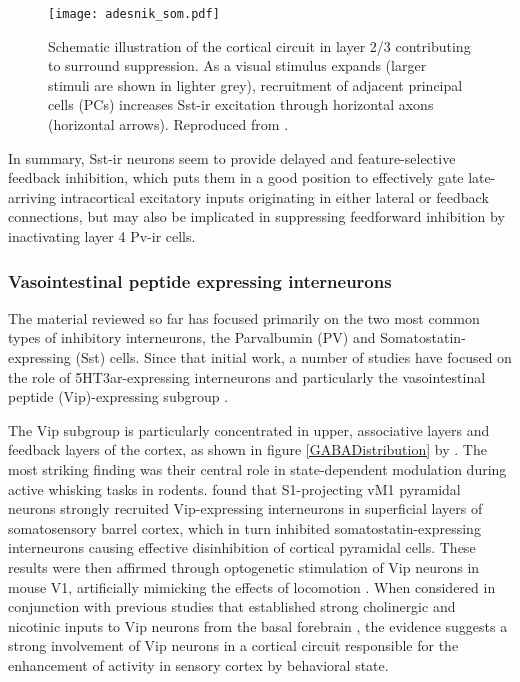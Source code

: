 \begin{figure}
	\centering
        \texttt{[image: adesnik\_som.pdf]}
	\caption[Schematic proposing Sst neurons' role in integrating
      long-range inputs. Reproduced from
      \cite{Adesnik2012}.]{Schematic illustration of the cortical
      circuit in layer 2/3 contributing to surround suppression. As a
      visual stimulus expands (larger stimuli are shown in lighter
      grey), recruitment of adjacent principal cells (PCs) increases
      Sst-ir excitation through horizontal axons (horizontal
      arrows). Reproduced from \cite{Adesnik2012}.}
	\label{som}
\end{figure}

In summary, Sst-ir neurons seem to provide delayed and
feature-selective feedback inhibition, which puts them in a good
position to effectively gate late-arriving intracortical excitatory
inputs originating in either lateral or feedback connections, but may
also be implicated in suppressing feedforward inhibition by
inactivating layer 4 Pv-ir cells.

\subsubsection{Vasointestinal peptide expressing interneurons}

The material reviewed so far has focused primarily on the two most
common types of inhibitory interneurons, the Parvalbumin (PV) and
Somatostatin-expressing (Sst) cells.  Since that initial work, a
number of studies have focused on the role of 5HT3ar-expressing
interneurons and particularly the vasointestinal peptide
(Vip)-expressing subgroup \citep{Lee2013, Fu2014, Higley2014,
  Kepecs2014}.

The Vip subgroup is particularly concentrated in upper, associative
layers and feedback layers of the cortex, as shown in figure
\ref{GABADistribution} by \cite{Rudy2011}. The most striking finding
was their central role in state-dependent modulation during active
whisking tasks in rodents. \cite{Lee2013} found that S1-projecting vM1
pyramidal neurons strongly recruited Vip-expressing interneurons in
superficial layers of somatosensory barrel cortex, which in turn
inhibited somatostatin-expressing interneurons causing effective
disinhibition of cortical pyramidal cells. These results were then
affirmed through optogenetic stimulation of Vip neurons in mouse V1,
artificially mimicking the effects of locomotion \citep{Fu2014}. When
considered in conjunction with previous studies that established
strong cholinergic and nicotinic inputs to Vip neurons from the basal
forebrain \citep{Wickersham2009}, the evidence suggests a strong
involvement of Vip neurons in a cortical circuit responsible for the
enhancement of activity in sensory cortex by behavioral state.

